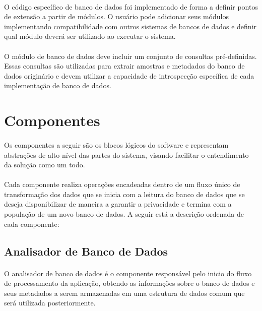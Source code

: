 \paragraph{} O código específico de banco de dados foi implementado de forma a definir pontos de extensão a partir de módulos. O usuário pode adicionar seus módulos implementando compatibilidade com outros sistemas de bancos de dados e definir qual módulo deverá ser utilizado ao executar o sistema.

\paragraph{} O módulo de banco de dados deve incluir um conjunto de consultas pré-definidas. Essas consultas são utilizadas para extrair amostras e metadados do banco de dados originário e devem utilizar a capacidade de introspecção específica de cada implementação de banco de dados.

\section{Componentes}

\paragraph{} Os componentes a seguir são os blocos lógicos do software e representam abstrações de alto nível das partes do sistema, visando facilitar o entendimento da solução como um todo.

\paragraph{} Cada componente realiza operações encadeadas dentro de um fluxo único de transformação dos dados que se inicia com a leitura do banco de dados que se deseja disponibilizar de maneira a garantir a privacidade e termina com a população de um novo banco de dados. A seguir está a descrição ordenada de cada componente:

\subsection{Analisador de Banco de Dados}

\paragraph{} O analisador de banco de dados é o componente responsável pelo inicio do fluxo de processamento da aplicação, obtendo as informações sobre o banco de dados e seus metadados a serem armazenadas em uma estrutura de dados comum que será utilizada posteriormente.

